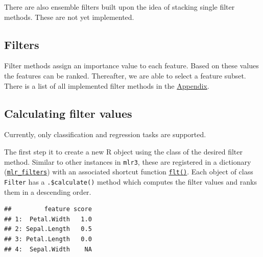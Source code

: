 \documentclass[
]{scrbook}
\newenvironment{Shaded}{\begin{snugshade}}{\end{snugshade}}
\newcommand{\FunctionTok}[1]{\textcolor[rgb]{0.00,0.00,0.00}{#1}}
\newcommand{\NormalTok}[1]{#1}
\newcommand{\OtherTok}[1]{\textcolor[rgb]{0.56,0.35,0.01}{#1}}
\newcommand{\SpecialCharTok}[1]{\textcolor[rgb]{0.00,0.00,0.00}{#1}}
\newcommand{\StringTok}[1]{\textcolor[rgb]{0.31,0.60,0.02}{#1}}
\renewenvironment{Shaded} {\begin{snugshade}\small} {\end{snugshade}}
\begin{document}
There are also ensemble filters built upon the idea of stacking single filter methods. These are not yet implemented.

\hypertarget{fs-filter}{%
\subsection{Filters}\label{fs-filter}}

Filter methods assign an importance value to each feature.
Based on these values the features can be ranked.
Thereafter, we are able to select a feature subset.
There is a list of all implemented filter methods in the \protect\hyperlink{list-filters}{Appendix}.

\hypertarget{fs-calc}{%
\subsection{Calculating filter values}\label{fs-calc}}

Currently, only classification and regression tasks are supported.

The first step it to create a new R object using the class of the desired filter method.
Similar to other instances in \texttt{mlr3}, these are registered in a dictionary (\href{https://mlr3filters.mlr-org.com/reference/mlr_filters.html}{\texttt{mlr\_filters}}) with an associated shortcut function \href{https://mlr3filters.mlr-org.com/reference/flt.html}{\texttt{flt()}}.
Each object of class \texttt{Filter} has a \texttt{.\$calculate()} method which computes the filter values and ranks them in a descending order.

\begin{Shaded}
\end{Shaded}

\begin{verbatim}
##         feature score
## 1:  Petal.Width   1.0
## 2: Sepal.Length   0.5
## 3: Petal.Length   0.0
## 4:  Sepal.Width    NA
\end{verbatim}
\end{document}
